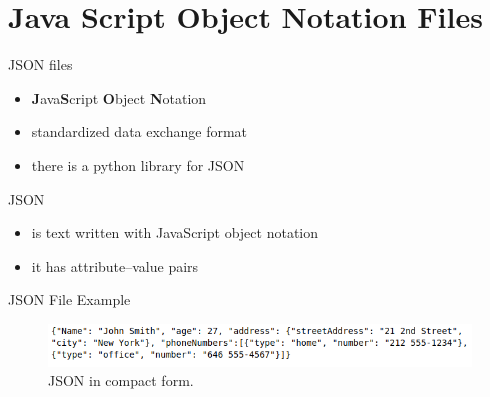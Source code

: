 \documentclass[
  american,
  ignorenonframetext,
]{beamer}
\begin{document}
\hypertarget{java-script-object-notation-files}{%
\section{Java Script Object Notation
Files}\label{java-script-object-notation-files}}

\begin{frame}{JSON files}
\protect\hypertarget{json-files}{}

\begin{itemize}
\item
  \textbf{J}ava\textbf{S}cript \textbf{O}bject \textbf{N}otation
\item
  standardized data exchange format
\item
  there is a python library for JSON \vspace{2em}
\end{itemize}

\begin{block}{JSON}

\begin{itemize}
\item
  is text written with JavaScript object notation
\item
  it has attribute--value pairs
\end{itemize}


\end{block}

\end{frame}

\begin{frame}{JSON File Example}
\protect\hypertarget{json-file-example}{}

\begin{figure}
\centering
\includegraphics[width=1\textwidth,height=\textheight]{06_FileIO/json_example_compact.png}
\caption{JSON in compact form.}
\end{figure}


\end{frame}
\end{document}
